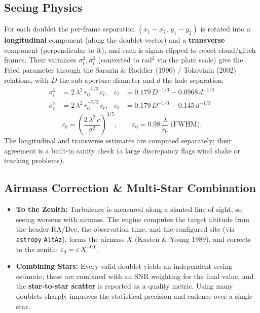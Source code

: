 \documentclass[11pt,a4paper]{article}
\begin{document}
\subsection{Seeing Physics}
For each doublet the per-frame separation $(x_1-x_2,\,y_1-y_2)$ is rotated into a \textbf{longitudinal} component (along the doublet vector) and a \textbf{transverse} component (perpendicular to it), and each is sigma-clipped to reject cloud/glitch frames. Their variances $\sigma_l^2,\sigma_t^2$ (converted to rad$^2$ via the plate scale) give the Fried parameter through the Sarazin \& Roddier (1990) / Tokovinin (2002) relations, with $D$ the sub-aperture diameter and $d$ the hole separation:
\begin{align*}
\sigma_l^2 &= 2\,\lambda^2\, r_0^{-5/3}\, c_l, & c_l &= 0.179\,D^{-1/3} - 0.0968\,d^{-1/3} \\
\sigma_t^2 &= 2\,\lambda^2\, r_0^{-5/3}\, c_t, & c_t &= 0.179\,D^{-1/3} - 0.145\,d^{-1/3}
\end{align*}
$$ r_0 = \left(\frac{2\,\lambda^2\, c}{\sigma^2}\right)^{3/5}, \qquad \varepsilon_0 = 0.98\,\frac{\lambda}{r_0} \;\text{(FWHM)}. $$
The longitudinal and transverse estimates are computed separately; their agreement is a built-in sanity check (a large discrepancy flags wind shake or tracking problems).

\subsection{Airmass Correction \& Multi-Star Combination}
\begin{itemize}[leftmargin=*]
    \item \textbf{To the Zenith:} Turbulence is measured along a slanted line of sight, so seeing worsens with airmass. The engine computes the target altitude from the header RA/Dec, the observation time, and the configured site (via \texttt{astropy} \texttt{AltAz}), forms the airmass $X$ (Kasten \& Young 1989), and corrects to the zenith: $\varepsilon_0 = \varepsilon\,X^{-0.6}$.
    \item \textbf{Combining Stars:} Every valid doublet yields an independent seeing estimate; these are combined with an SNR weighting for the final value, and the \textbf{star-to-star scatter} is reported as a quality metric. Using many doublets sharply improves the statistical precision and cadence over a single star.
\end{itemize}
\end{document}
